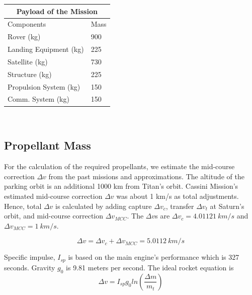 \documentclass[conf]{new-aiaa}
\begin{document}
{\begin{center}

\begin{tabular}{ |p{4cm}||p{2cm}|  }
 \hline
 \multicolumn{2}{|c|}{Payload of the Mission} \\
 \hline
 \hline
 Components&Mass\\
 \hline
 Rover (kg)&900\\
 \hline
 Landing Equipment (kg)&225\\
 \hline
 Satellite (kg)&730\\
 \hline
 Structure (kg)&225\\
 \hline
 Propulsion System (kg)&150\\
 \hline
 Comm. System (kg)&150\\
 \hline

\end{tabular}
\end{center}
\\

\subsection{Propellant Mass}
\par For the calculation of the required propellants, we estimate the mid-course correction $\Delta v$ from the past missions and approximations. The altitude of the parking orbit is an additional 1000 km from Titan's orbit. Cassini Mission’s estimated mid-course correction $\Delta v$ was about 1 km/s as total adjustments\cite{goodson_gray_hahn_peralta_1998}. Hence, total $\Delta v$ is calculated by adding capture $\Delta v_{c}$, transfer $\Delta v_{t}$ at Saturn’s orbit, and mid-course correction $\Delta v_{MCC}$. The $\Delta v$s are $\Delta v_{c} = 4.01121 \ km/s$ and $\Delta v_{MCC} = 1 \ km/s$.
 



\begin{equation}
\Delta v = \Delta v_{c}+ \Delta v_{MCC} = 5.0112 \ km/s  
\end{equation}
   


\par 
 Specific impulse, $I_{sp}$ is based on the main engine’s performance which is 327 seconds. 
Gravity $g_{0}$ is 9.81 meters per second.
The ideal rocket equation\cite{curtis_2020} is\\

\begin{equation}
\Delta v = I_{sp}g_{0}ln(\frac{\Delta m}{m_t})    
\end{equation}



}
\end{document}
